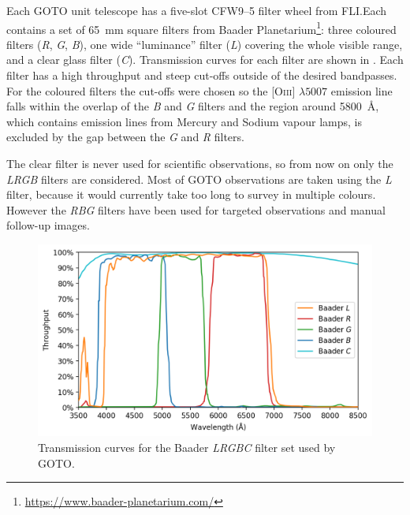\begin{colsection}
\begin{colsection}
Each GOTO unit telescope has a five-slot CFW9--5 filter wheel from FLI.\@ Each contains a set of \SI{65}{\milli\metre} square filters from Baader Planetarium\footnote{\url{https://www.baader-planetarium.com/}}: three coloured filters (\textit{R}, \textit{G}, \textit{B}), one wide ``luminance'' filter (\textit{L}) covering the whole visible range, and a clear glass filter ({\textit{C}}). Transmission curves for each filter are shown in . Each filter has a high throughput and steep cut-offs outside of the desired bandpasses. For the coloured filters the cut-offs were chosen so the [O\textsc{iii}] $\lambda 5007$ emission line falls within the overlap of the \textit{B} and \textit{G} filters and the region around \SI{5800}{\angstrom}, which contains emission lines from Mercury and Sodium vapour lamps, is excluded by the gap between the \textit{G} and \textit{R} filters.

The clear filter is never used for scientific observations, so from now on only the \textit{LRGB} filters are considered. Most of GOTO observations are taken using the \textit{L} filter, because it would currently take too long to survey in multiple colours. However the \textit{RBG} filters have been used for targeted observations and manual follow-up images.

\begin{figure}[t]
    \begin{center}
        \includegraphics[width=\textwidth]{images/throughput/trans_filters.png}
    \end{center}
    \caption[Baader filter transmission curves]{
        Transmission curves for the Baader \textit{LRGBC} filter set used by GOTO.\
    }\label{fig:filters}
\end{figure}

\newpage


\end{colsection}
\end{colsection}
